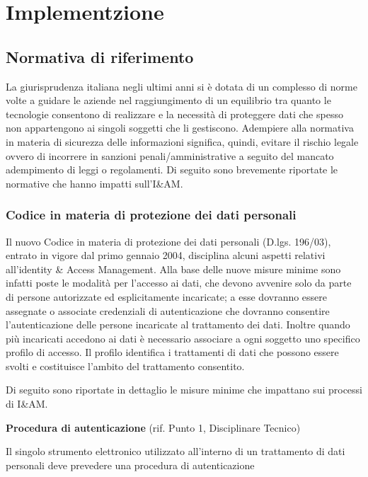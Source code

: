 \chapter{Implementzione}





\section{Normativa di riferimento}
La giurisprudenza italiana negli ultimi anni si \`e dotata di un
complesso di norme volte a guidare le aziende nel raggiungimento di un
equilibrio tra quanto le tecnologie consentono di realizzare e la
necessit\`a di proteggere dati che spesso non appartengono ai singoli
soggetti che li gestiscono. Adempiere alla normativa in materia di
sicurezza delle informazioni significa, quindi, evitare il rischio
legale ovvero di incorrere in sanzioni penali/amministrative a seguito
del mancato adempimento di leggi o regolamenti. Di seguito sono
brevemente riportate le normative che hanno impatti
sull'I\&AM.

\subsection{Codice in materia di protezione dei dati personali}

Il nuovo Codice in materia di protezione dei dati personali (D.lgs.
196/03), entrato in vigore dal primo gennaio 2004, disciplina alcuni
aspetti relativi all'identity \& Access Management.
Alla base delle nuove misure minime sono infatti poste le modalit\`a
per l'accesso ai dati, che devono avvenire solo da
parte di persone autorizzate ed esplicitamente incaricate; a esse
dovranno essere assegnate o associate credenziali di
autenticazione che dovranno consentire
l'autenticazione delle persone incaricate al
trattamento dei dati. Inoltre quando pi\`u incaricati accedono ai dati
\`e necessario associare a ogni soggetto uno specifico profilo di
accesso. Il profilo identifica i trattamenti di dati che possono essere
svolti e costituisce l'ambito del trattamento
consentito.

Di seguito sono riportate in dettaglio le misure minime che impattano
sui processi di I\&AM.


\textbf{Procedura di autenticazione} (rif. Punto 1, Disciplinare Tecnico)

Il singolo strumento elettronico utilizzato all'interno
di un trattamento di dati personali deve prevedere una procedura di
autenticazione


